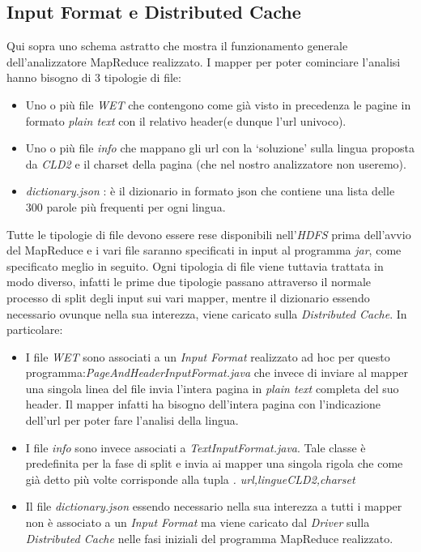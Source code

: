 \documentclass{article}
\newcommand{\MR}{MapReduce}
\newcommand{\cld}{\textit{CLD2}}
\newcommand{\pt}{\textit{plain text}}
\newcommand{\filename}[1]{\textit{#1}}
\begin{document}
\subsection{Input Format e Distributed Cache}
Qui sopra uno schema astratto che mostra il funzionamento generale dell'analizzatore \MR{} realizzato. I mapper per poter cominciare l'analisi hanno bisogno di 3 tipologie di file: 
\begin{itemize}
    \item Uno o più file \textit{WET} che contengono come già visto in precedenza le pagine in formato \pt{} con il relativo header(e dunque l'url univoco).
    \item Uno o più file \textit{info} che mappano gli url con la `soluzione' sulla lingua proposta da \cld{} e il charset della pagina (che nel nostro analizzatore non useremo).
    \item \filename{dictionary.json} : è il dizionario in formato json che contiene una lista delle 300 parole più frequenti per ogni lingua.
\end{itemize}
Tutte le tipologie di file devono essere rese disponibili nell'\textit{HDFS} prima dell'avvio del \MR{} e i vari file saranno specificati in input al programma \textit{jar}, come specificato meglio in seguito. Ogni tipologia di file viene tuttavia trattata in modo diverso, infatti le prime due tipologie passano attraverso il normale processo di split degli input sui vari mapper, mentre il dizionario essendo necessario ovunque nella sua interezza, viene caricato sulla \textit{Distributed Cache}. In particolare:
\begin{itemize}
    \item I file \textit{WET} sono associati a un \textit{Input Format} realizzato ad hoc per questo programma:\filename{PageAndHeaderInputFormat.java} che invece di inviare al mapper una singola linea del file invia l'intera pagina in \pt{} completa del suo header. Il mapper infatti ha bisogno dell'intera pagina con l'indicazione dell'url per poter fare l'analisi della lingua.
    \item I file \textit{info} sono invece associati a \filename{TextInputFormat.java}. Tale classe è predefinita per la fase di split e invia ai mapper una singola rigola che come già detto più volte corrisponde alla tupla \textit{\textlangle. url,lingue\cld{},charset\textrangle}
    \item Il file \filename{dictionary.json} essendo necessario nella sua interezza a tutti i mapper non è associato a un \textit{Input Format} ma viene caricato dal \filename{Driver} sulla \textit{Distributed Cache} nelle fasi iniziali del programma \MR{} realizzato.
\end{itemize}
\end{document}
